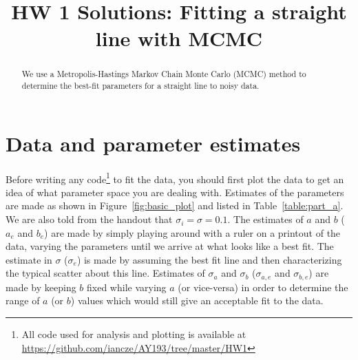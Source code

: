 \documentclass[iop,floatfix]{emulateapj}
\begin{document}
\title{HW 1 Solutions: Fitting a straight line with MCMC}

\author{}


\begin{abstract}
We use a Metropolis-Hastings Markov Chain Monte Carlo (MCMC) method to determine the best-fit parameters for a straight line to noisy data.
\end{abstract}

\section{Data and parameter estimates}
Before writing any code\footnote{All code used for analysis and plotting is available at \url{https://github.com/iancze/AY193/tree/master/HW1}} to fit the data, you should first plot the data to get an idea of what parameter space you are dealing with. Estimates of the parameters are made as shown in Figure~\ref{fig:basic_plot} and listed in Table~\ref{table:part_a}. We are also told from the handout that $\sigma_i = \sigma = 0.1$. The estimates of $a$ and $b$ ($a_e$ and $b_e$) are made by simply playing around with a ruler on a printout of the data, varying the parameters until we arrive at what looks like a best fit. The estimate in $\sigma$ ($\sigma_e$) is made by assuming the best fit line and then characterizing the typical scatter about this line. Estimates of $\sigma_a$ and $\sigma_b$ ($\sigma_{a,e}$ and $\sigma_{b,e}$) are made by keeping $b$ fixed while varying $a$ (or vice-versa) in order to determine the range of $a$ (or $b$) values which would still give an acceptable fit to the data. 
\end{document}
